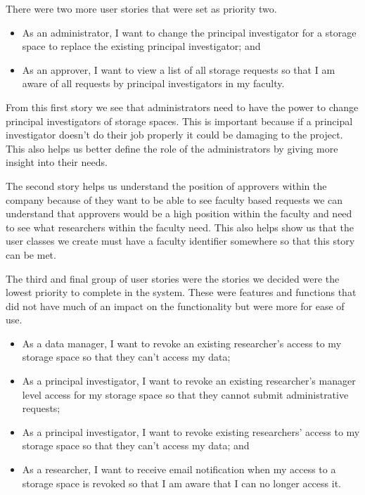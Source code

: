 \documentclass[a4paper,titlepage,12pt]{article}
\begin{document}
There were two more user stories that were set as priority two.

\begin{itemize}
	\item As an administrator, I want to change the principal investigator
	      for a storage space to replace the existing principal
	      investigator; and
	\item As an approver, I want to view a list of all storage requests so
	      that I am aware of all requests by principal investigators in my
	      faculty.
\end{itemize}

From this first story we see that administrators need to have the power to
change principal investigators of storage spaces. This is important because if
a principal investigator doesn't do their job properly it could be damaging to
the project. This also helps us better define the role of the administrators by
giving more insight into their needs.

The second story helps us understand the position of approvers within the
company because of they want to be able to see faculty based requests we can
understand that approvers would be a high position within the faculty and need
to see what researchers within the faculty need. This also helps show us that
the user classes we create must have a faculty identifier somewhere so that
this story can be met.

The third and final group of user stories were the stories we decided were the
lowest priority to complete in the system. These were features and functions
that did not have much of an impact on the functionality but were more for ease
of use.

\begin{itemize}
	\item As a data manager, I want to revoke an existing researcher's
	      access to my storage space so that they can't access my data;
	\item As a principal investigator, I want to revoke an existing
	      researcher's manager level access for my storage space so that
	      they cannot submit administrative requests;
	\item As a principal investigator, I want to revoke existing
	      researchers' access to my storage space so that they can't access
	      my data; and
	\item As a researcher, I want to receive email notification when my
	      access to a storage space is revoked so that I am aware that I
	      can no longer access it.
\end{itemize}
\end{document}
